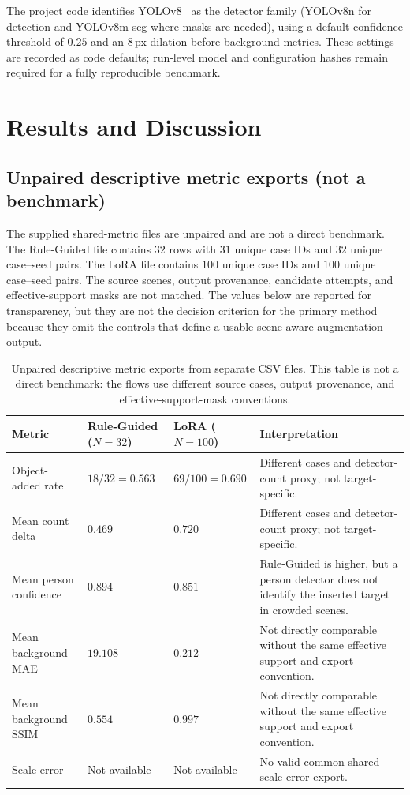 \documentclass[11pt,a4paper]{article}
\begin{document}
The project code identifies YOLOv8~\cite{yolov8} as the detector family (YOLOv8n
for detection and YOLOv8m-seg where masks are needed), using a default confidence
threshold of $0.25$ and an $8$\,px dilation before background metrics. These
settings are recorded as code defaults; run-level model and configuration hashes
remain required for a fully reproducible benchmark.
\section{Results and Discussion}\label{sec:results}

\subsection{Unpaired descriptive metric exports (not a benchmark)}\label{sec:rawmetrics}
The supplied shared-metric files are unpaired and are not a direct benchmark. The Rule-Guided file contains $32$ rows with $31$ unique case IDs and $32$ unique case--seed pairs. The LoRA file contains $100$ unique case IDs and $100$ unique case--seed pairs. The source scenes, output provenance, candidate attempts, and effective-support masks are not matched. The values below are reported for transparency, but they are not the decision criterion for the primary method because they omit the controls that define a usable scene-aware augmentation output.

\begin{table}[t]
  \centering
  \caption[Unpaired descriptive metric exports]{Unpaired descriptive metric exports from separate CSV files. This table is not a direct benchmark: the flows use different source cases, output provenance, and effective-support-mask conventions.}
  \label{tab:raw-shared-comparison}
  \scriptsize
  \begin{tabular}{@{}p{2.85cm}p{2.1cm}p{2.1cm}p{3.35cm}@{}}
    \toprule
    \textbf{Metric} & \textbf{Rule-Guided ($N=32$)} & \textbf{LoRA ($N=100$)} & \textbf{Interpretation} \\
    \midrule
    Object-added rate & $18/32=0.563$ & $69/100=0.690$ & Different cases and detector-count proxy; not target-specific. \\
    Mean count delta & $0.469$ & $0.720$ & Different cases and detector-count proxy; not target-specific. \\
    Mean person confidence & $0.894$ & $0.851$ & Rule-Guided is higher, but a person detector does not identify the inserted target in crowded scenes. \\
    Mean background MAE & $19.108$ & $0.212$ & Not directly comparable without the same effective support and export convention. \\
    Mean background SSIM & $0.554$ & $0.997$ & Not directly comparable without the same effective support and export convention. \\
    Scale error & Not available & Not available & No valid common shared scale-error export. \\
    \bottomrule
  \end{tabular}
\end{table}
\end{document}
